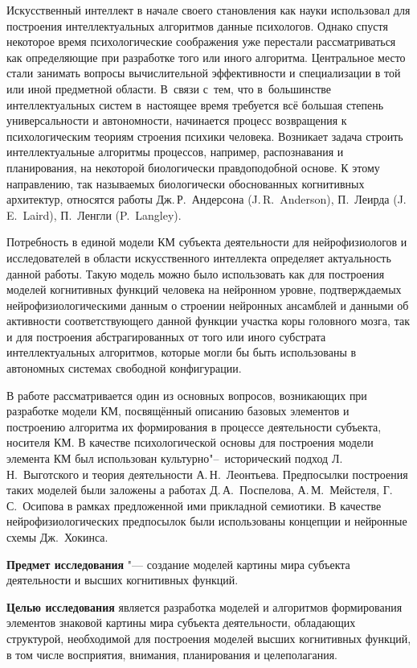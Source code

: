 Искусственный интеллект в начале своего становления как науки использовал для построения интеллектуальных алгоритмов данные психологов. Однако спустя некоторое время психологические соображения уже перестали рассматриваться как определяющие при разработке того или иного алгоритма. Центральное место стали занимать вопросы вычислительной эффективности и специализации в той или иной предметной области. В~связи с~тем, что в~большинстве интеллектуальных систем в~настоящее время требуется всё большая степень универсальности и автономности, начинается процесс возвращения к психологическим теориям строения психики человека. Возникает задача строить интеллектуальные алгоритмы процессов, например, распознавания и планирования, на некоторой биологически правдоподобной основе. К этому направлению, так называемых биологически обоснованных когнитивных архитектур, относятся работы Дж.\,Р.~Андерсона (J.\,R.~Anderson), П.~Леирда (J.\,E.~Laird), П.~Ленгли (P.~Langley).

Потребность в единой модели КМ субъекта деятельности для нейрофизиологов и исследователей в области искусственного интеллекта определяет актуальность данной работы. Такую модель можно было использовать как для построения моделей когнитивных функций человека на нейронном уровне, подтверждаемых нейрофизиологическими данным о строении нейронных ансамблей и данными об активности соответствующего данной функции участка коры головного мозга, так и для построения абстрагированных от того или иного субстрата интеллектуальных алгоритмов, которые могли бы быть использованы в автономных системах свободной конфигурации.

В работе рассматривается один из основных вопросов, возникающих при разработке модели КМ, посвящённый описанию базовых элементов и построению алгоритма их формирования в процессе деятельности субъекта, носителя КМ. В качестве психологической основы для построения модели элемента КМ был использован культурно"--~исторический подход Л.\,Н.~Выготского и теория деятельности А.\,Н.~Леонтьева. Предпосылки построения таких моделей были заложены а работах Д.\,А.~Поспелова, А.\,М.~Мейстеля, Г.\,С.~Осипова в рамках предложенной ими прикладной семиотики. В качестве нейрофизиологических предпосылок были использованы концепции и нейронные схемы Дж.~Хокинса.

\textbf{Предмет исследования} "--- создание моделей картины мира субъекта деятельности и высших когнитивных функций.

\textbf{Целью исследования} является разработка моделей и алгоритмов формирования элементов знаковой картины мира субъекта деятельности, обладающих структурой, необходимой для построения моделей высших когнитивных функций, в том числе восприятия, внимания, планирования и целеполагания.

